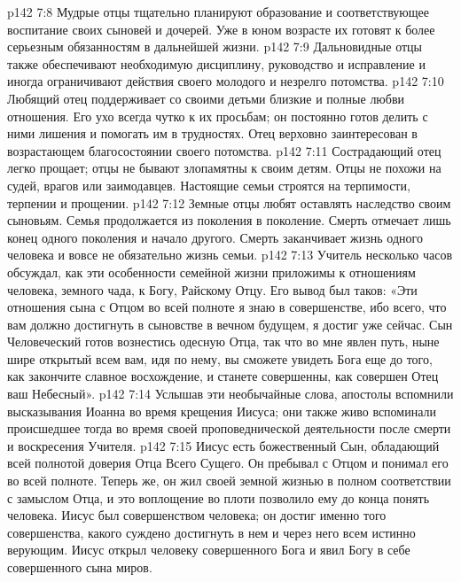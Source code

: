 \vs p142 7:8 \pc {}\bibnobreakspace {} Мудрые отцы тщательно планируют образование и соответствующее воспитание своих сыновей и дочерей. Уже в юном возрасте их готовят к более серьезным обязанностям в дальнейшей жизни.
\vs p142 7:9 \pc {}\bibnobreakspace {}  Дальновидные отцы также обеспечивают необходимую дисциплину, руководство и исправление и иногда ограничивают действия своего молодого и незрелго потомства.
\vs p142 7:10 \pc {}\bibnobreakspace {} Любящий отец поддерживает со своими детьми близкие и полные любви отношения. Его ухо всегда чутко к их просьбам; он постоянно готов делить с ними лишения и помогать им в трудностях. Отец верховно заинтересован в возрастающем благосостоянии своего потомства.
\vs p142 7:11 \pc {}\bibnobreakspace {} Сострадающий отец легко прощает; отцы не бывают злопамятны к своим детям. Отцы не похожи на судей, врагов или заимодавцев. Настоящие семьи строятся на терпимости, терпении и прощении.
\vs p142 7:12 \pc {}\bibnobreakspace {} Земные отцы любят оставлять наследство своим сыновьям. Семья продолжается из поколения в поколение. Смерть отмечает лишь конец одного поколения и начало другого. Смерть заканчивает жизнь одного человека и вовсе не обязательно жизнь семьи.
\vs p142 7:13 \pc Учитель несколько часов обсуждал, как эти особенности семейной жизни приложимы к отношениям человека, земного чада, к Богу, Райскому Отцу. Его вывод был таков: «Эти отношения сына с Отцом во всей полноте я знаю в совершенстве, ибо всего, что вам должно достигнуть в сыновстве в вечном будущем, я достиг уже сейчас. Сын Человеческий готов вознестись одесную Отца, так что во мне явлен путь, ныне шире открытый всем вам, идя по нему, вы сможете увидеть Бога еще до того, как закончите славное восхождение, и станете совершенны, как совершен Отец ваш Небесный».
\vs p142 7:14 Услышав эти необычайные слова, апостолы вспомнили высказывания Иоанна во время крещения Иисуса; они также живо вспоминали происшедшее тогда во время своей проповеднической деятельности после смерти и воскресения Учителя.
\vs p142 7:15 Иисус есть божественный Сын, обладающий всей полнотой доверия Отца Всего Сущего. Он пребывал с Отцом и понимал его во всей полноте. Теперь же, он жил своей земной жизнью в полном соответствии с замыслом Отца, и это воплощение во плоти позволило ему до конца понять человека. Иисус был совершенством человека; он достиг именно того совершенства, какого суждено достигнуть в нем и через него всем истинно верующим. Иисус открыл человеку совершенного Бога и явил Богу в себе совершенного сына миров.
